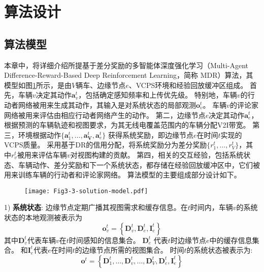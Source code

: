 \section{算法设计}\label{section 3-4}

\subsection{算法模型}
本章中，将详细介绍所提基于差分奖励的多智能体深度强化学习（Multi-Agent Difference-Reward-Based Deep Reinforcement Learning，简称 MDR）算法，其模型如图\ref{fig 3-3}所示，是由$V$辆车、边缘节点$e$、VCPS环境和经验回放缓冲区组成。
首先，车辆$v$决定其动作$\boldsymbol{a}_{v}^{t}$，包括确定感知频率和上传优先级。
特别地，车辆$v$的行动者网络被用来生成其动作，其输入是对系统状态的局部观测$\boldsymbol{o}_{v}^{t}$。
车辆$v$的评论家网络被用来评估由相应行动者网络产生的动作。
第二，边缘节点$e$决定其动作$\boldsymbol{a}_{e}^{t}$，根据预测的车辆轨迹和视图要求，为其无线电覆盖范围内的车辆分配V2I带宽。
第三，环境根据动作$\{ \boldsymbol{a}_{1}^{t}, \ldots, \boldsymbol{a}_{\mathbf{V}}^{t}, \boldsymbol{a}_{e}^{t}\}$ 获得系统奖励，即边缘节点$e$在时间$t$实现的VCPS质量。
采用基于DR的信用分配，将系统奖励分为差分奖励$\{r_1^t, \ldots, r_{V}^t\}$，其中$r_v^t$被用来评估车辆$v$对视图构建的贡献。
第四，相关的交互经验，包括系统状态、车辆动作、差分奖励和下一个系统状态，都存储在经验回放缓冲区中，它们被用来训练车辆的行动者和评论家网络。
算法模型的主要组成部分设计如下。

\begin{figure}[h]
\centering
  \texttt{[image: Fig3-3-solution-model.pdf]}
  \label{fig 3-3}
\end{figure}

1) \textbf{系统状态}: 边缘节点定期广播其视图需求和缓存信息。在$t$时间内，车辆$v$的系统状态的本地观测被表示为 
	\begin{equation}
		\boldsymbol{o}_{v}^{t}=\left\{\mathbf{D}_{v}^{t}, \mathbf{D}_{e}^{t}, \mathbf{I}_e^t\right\}
	\end{equation} 
	\noindent 其中$\mathbf{D}_{v}^{t}$代表车辆$v$在$t$时间感知的信息集合。
	$\mathbf{D}_{e}^{t}$ 代表$t$时边缘节点$e$中的缓存信息集合。
	和$\mathbf{I}_e^t$代表$e$在时间$t$的边缘节点所需的视图集合。
	时间$t$的系统状态被表示为:
	\begin{equation}
		\boldsymbol{o}^{t}=\left\{\mathbf{D}_{1}^{t}, \ldots, \mathbf{D}_{v}^{t}, \ldots, \mathbf{D}_{V}^{t}, \mathbf{D}_{e}^{t}, \mathbf{I}_{e}^{t}\right\}
	\end{equation}

